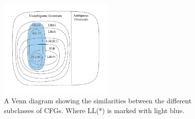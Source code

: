 \begin{figure}[!ht]
\centering
 \includegraphics[width=0.5\textwidth]{figures/classesofgrammars.png} %
\caption[A Venn diagram showing the similarities between the different subclasses of CFGs]{A Venn diagram showing the similarities between the different subclasses of CFGs. Where LL(*) is marked with light blue. \citep{Lecture5}}
\label{fig:hierarchyofgrammars}
\vspace{-15pt}
\end{figure}
